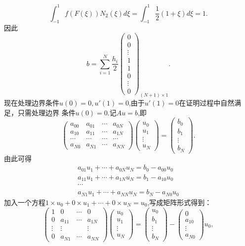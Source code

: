 \documentclass{ctexart}
\begin{document}
$$
\int_{-1}^{1} f(F(\xi))N_2(\xi)d\xi=\int_{-1}^{1}\frac{1}{2}(1+\xi)d\xi = 1.
$$
因此
$$
b=\sum_{i=1}^{N}\frac{h_i}{2} \begin{pmatrix}
  0\\
  0\\
  \vdots\\
 1\\
  1\\
  0\\
  \vdots \\
 0
 \end{pmatrix}_{(N+1)\times 1} .
$$
现在处理边界条件$u(0)=0,u'(1)=0$,由于$u'(1)=0$在证明过程中自然满足，只需处理边界
条件$u(0)=0$.记$Au=b$,即
$$
\begin{pmatrix}
  a_{00}& a_{01} & \cdots  & a_{0N} \\
  a_{10} &  a_{11} &  \cdots & a_{1N} \\
 \cdots  & \cdots  & \cdots  & \cdots  \\
 a_{N0} & a_{N1} & \cdots  & a_{NN}
\end{pmatrix}
\begin{pmatrix}
 u_0\\
 u_1\\
 \vdots\\
u_N
\end{pmatrix}=
\begin{pmatrix}
 b_0\\
 b_1\\
 \vdots\\
b_N
\end{pmatrix}.
$$
由此可得
$$
\begin{matrix}
  a_{01}u_1+\cdots +a_{0N}u_N=b_0-a_{00}u_0\\
  a_{11}u_1+\cdots +a_{1N}u_N=b_1-a_{10}u_0\\
  \cdots \\
 a_{N1}u_1+\cdots +a_{NN}u_N=b_N-a_{N0}u_0
 \end{matrix}
$$
加入一个方程$1\times u_0 + 0 \times u_1 + \cdots +0 \times u_N = u_0$,写成矩阵形式得到：
$$
\begin{pmatrix}
  1 & 0 & \cdots & 0 \\
  0 & a_{11} & \cdots  & a_{1N}\\
  \vdots & \vdots &  & \vdots\\
  0 & a_{N1} & \cdots & a_{NN}
 \end{pmatrix}
 \begin{pmatrix}
  u_0\\
  u_1\\
  \vdots\\
 u_N
 \end{pmatrix}=
 \begin{pmatrix}
  u_0\\
  b_1\\
  \vdots\\
 b_N
 \end{pmatrix}-
 \begin{pmatrix}
 0 \\
 a_{10} \\
 \vdots \\
 a_{N0}
 \end{pmatrix}u_0,
$$
\end{document}
